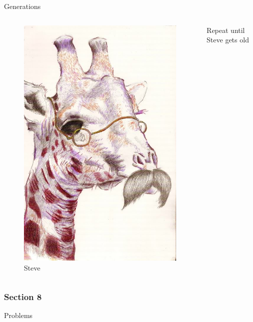 \documentclass[24pt]{beamer}
\begin{document}
    \begin{frame}{Generations}
        \begin{columns}
                \begin{figure}
                \includegraphics[scale=0.2]{OldGiraffe}
                \caption{Steve}
                \end{figure}
                Repeat until Steve gets old
        \end{columns}
    \end{frame}

    \begin{centering}
        \begin{frame}[c]{}
            \frametitle{Section 8}
            Problems
        \end{frame}
    \end{centering}
\end{document}
